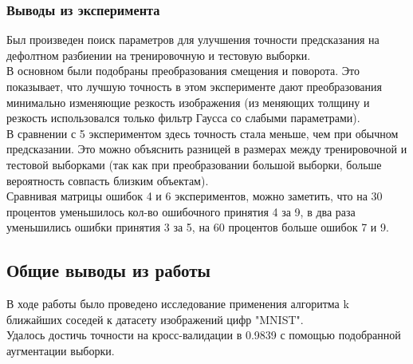 \documentclass[10pt]{article}
\begin{document}
\begin{itemize}
{		    }
		    
		    \subsubsection*{Выводы из эксперимента}
		    {
		    	Был произведен поиск параметров для улучшения точности предсказания на дефолтном разбиении на тренировочную и тестовую выборки.\\
		    	В основном были подобраны преобразования смещения и поворота. Это
		    	показывает, что лучшую точность в этом эксперименте дают преобразования минимально изменяющие резкость изображения (из меняющих толщину и резкость использовался только фильтр Гаусса со слабыми параметрами).\\
		    	В сравнении с 5 экспериментом здесь точность стала меньше, чем при обычном предсказании. Это можно объяснить разницей в размерах между тренировочной и тестовой выборками (так как при преобразовании большой выборки, больше вероятность совпасть близким объектам).\\
		    	Сравнивая матрицы ошибок 4 и 6 экспериментов, можно заметить, что на 30 процентов уменьшилось кол-во ошибочного принятия 4 за 9, в два раза уменьшились ошибки принятия 3 за 5, на 60 процентов больше ошибок 7 и 9.
		    	
		    }

	\end{itemize}

    \begin{center} \section*{Общие выводы из работы} \end{center}
    В ходе работы было проведено исследование применения алгоритма k ближайших соседей к датасету изображений цифр "MNIST".\\
    Удалось достичь точности на кросс-валидации в 0.9839 с помощью подобранной аугментации выборки.
	
\end{document}
